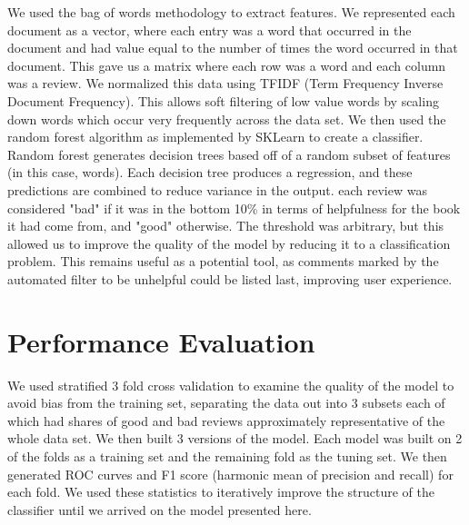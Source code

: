 \documentclass{article}
\begin{document}
\begin{multicols}{2}
We used the bag of words methodology to extract features. We represented each document as a vector, where each entry was a word that occurred in the document and had value equal to the number of times the word occurred in that document. This gave us a matrix where each row was a word and each column was a review. We normalized this data using TFIDF (Term Frequency Inverse Document Frequency). This allows soft filtering of low value words by scaling down words which occur very frequently across the data set. We then used the random forest algorithm as implemented by SKLearn to create a classifier. Random forest generates decision trees based off of a random subset of features (in this case, words). Each decision tree produces a regression, and these predictions are combined to reduce variance in the output. each review was considered "bad" if it was in the bottom 10\% in terms of helpfulness for the book it had come from, and "good" otherwise. The threshold was arbitrary, but this allowed us to improve the quality of the model by reducing it to a classification problem. This remains useful as a potential tool, as comments marked by the automated filter to be unhelpful could be listed last, improving user experience.

\section{Performance Evaluation}

We used stratified 3 fold cross validation to examine the quality of the model to avoid bias from the training set, separating the data out into 3 subsets each of which had shares of good and bad reviews approximately representative of the whole data set. We then built 3 versions of the model. Each model was built on 2 of the folds as a training set and the remaining fold as the tuning set. We then generated ROC curves and F1 score (harmonic mean of precision and recall) for each fold. We used these statistics to iteratively improve the structure of the classifier until we arrived on the model presented here.


\end{multicols}
\end{document}
